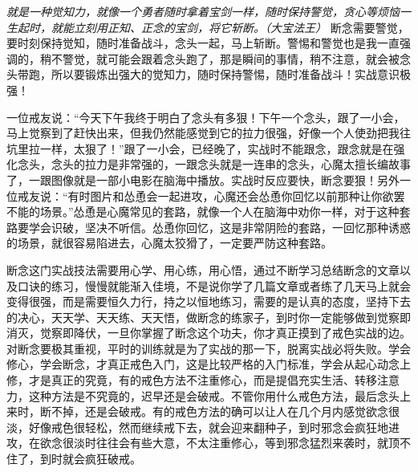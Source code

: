 \textit{就是一种觉知力，就像一个勇者随时拿着宝剑一样，随时保持警觉，贪心等烦恼一生起时，就能立刻用正知、正念的宝剑，将它斩断。（大宝法王）} 断念需要警觉，要时刻保持觉知，随时准备战斗，念头一起，马上斩断。警惕和警觉也是我一直强调的，稍不警觉，就可能会跟着念头跑了，那是瞬间的事情，稍不注意，就会被念头带跑，所以要锻炼出强大的觉知力，随时保持警惕，随时准备战斗！实战意识极强！

一位戒友说：“今天下午我终于明白了念头有多狠！下午一个念头，跟了一小会，马上觉察到了赶快出来，但我仍然能感觉到它的拉力很强，好像一个人使劲把我往坑里拉一样，太狠了！”跟了一小会，已经晚了，实战时不能跟念，跟念就是在强化念头，念头的拉力是非常强的，一跟念头就是一连串的念头，心魔太擅长编故事了，一跟图像就是一部小电影在脑海中播放。实战时反应要快，断念要狠！另外一位戒友说：“有时图片和怂恿会一起进攻，心魔还会怂恿你回忆以前那种让你欲罢不能的场景。”怂恿是心魔常见的套路，就像一个人在脑海中劝你一样，对于这种套路要学会识破，坚决不听信。怂恿你回忆，这是非常阴险的套路，一回忆那种诱惑的场景，就很容易陷进去，心魔太狡猾了，一定要严防这种套路。

断念这门实战技法需要用心学、用心练，用心悟，通过不断学习总结断念的文章以及口诀的练习，慢慢就能渐入佳境，不是说你学了几篇文章或者练了几天马上就会变得很强，而是需要恒久力行，持之以恒地练习，需要的是认真的态度，坚持下去的决心，天天学、天天练、天天悟，做断念的练家子，到时你一定能够做到觉察即消灭，觉察即降伏，一旦你掌握了断念这个功夫，你才真正摸到了戒色实战的边。对断念要极其重视，平时的训练就是为了实战的那一下，脱离实战必将失败。学会修心，学会断念，才真正戒色入门，这是比较严格的入门标准，学会从起心动念上修，才是真正的究竟，有的戒色方法不注重修心，而是提倡充实生活、转移注意力，这种方法是不究竟的，迟早还是会破戒。不管你用什么戒色方法，最后念头上来时，断不掉，还是会破戒。有的戒色方法的确可以让人在几个月内感觉欲念很淡，好像戒色很轻松，然而继续戒下去，就会迎来翻种子，到时邪念会疯狂地进攻，在欲念很淡时往往会有些大意，不太注重修心，等到邪念猛烈来袭时，就顶不住了，到时就会疯狂破戒。

